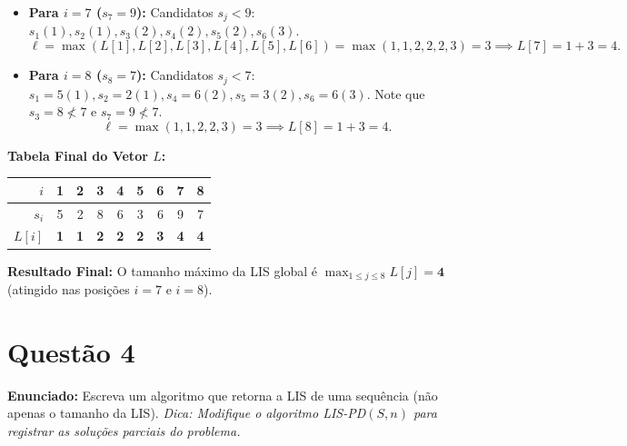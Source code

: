 \documentclass[11pt,a4paper]{article}
\begin{document}
\begin{itemize}
\begin{align*}
    j = 1 &: s_1 = 5 < 6 \implies L[1] = 1 \\
    j = 2 &: s_2 = 2 < 6 \implies L[2] = 1 \\
    j = 3, 4 &: s_3 = 8 \not< 6, \; s_4 = 6 \not< 6 \text{ (estritamente menor)} \\
    j = 5 &: s_5 = 3 < 6 \implies L[5] = 2 \implies \ell = \max(1, 2) = 2 \implies L[6] = 1 + 2 = 3.
    \end{align*}
    \item \textbf{Para $i = 7$ ($s_7 = 9$):}
    Candidatos $s_j < 9$: $s_1(1), s_2(1), s_3(2), s_4(2), s_5(2), s_6(3)$.
    \[
    \ell = \max(L[1], L[2], L[3], L[4], L[5], L[6]) = \max(1, 1, 2, 2, 2, 3) = 3 \implies L[7] = 1 + 3 = 4.
    \]
    \item \textbf{Para $i = 8$ ($s_8 = 7$):}
    Candidatos $s_j < 7$: $s_1=5(1), s_2=2(1), s_4=6(2), s_5=3(2), s_6=6(3)$. Note que $s_3 = 8 \not< 7$ e $s_7 = 9 \not< 7$.
    \[
    \ell = \max(1, 1, 2, 2, 3) = 3 \implies L[8] = 1 + 3 = 4.
    \]
\end{itemize}

\textbf{Tabela Final do Vetor $L$:}
\begin{center}
\begin{tabular}{r|cccccccc}
\toprule
$i$ & 1 & 2 & 3 & 4 & 5 & 6 & 7 & 8 \\
\midrule
$s_i$ & 5 & 2 & 8 & 6 & 3 & 6 & 9 & 7 \\
$L[i]$ & \textbf{1} & \textbf{1} & \textbf{2} & \textbf{2} & \textbf{2} & \textbf{3} & \textbf{4} & \textbf{4} \\
\bottomrule
\end{tabular}
\end{center}

\textbf{Resultado Final:} O tamanho máximo da LIS global é $\max_{1 \le j \le 8} L[j] = \mathbf{4}$ (atingido nas posições $i = 7$ e $i = 8$).

\vspace{0.4cm}

\section*{Questão 4}
\textbf{Enunciado:} Escreva um algoritmo que retorna a LIS de uma sequência (não apenas o tamanho da LIS). \emph{Dica: Modifique o algoritmo \textsc{LIS-PD}$(S, n)$ para registrar as soluções parciais do problema.}
\end{document}
